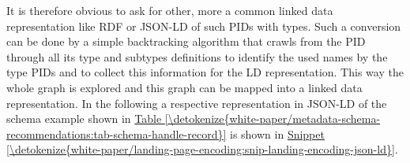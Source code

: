 \documentclass[a4paper,10pt,english]{sphinxmanual}
\begin{document}
It is therefore obvious to ask for other, more a common linked data
representation like RDF or JSON-LD of such PIDs with types. Such a
conversion can be done by a simple backtracking algorithm that crawls
from the PID through all its type and subtypes definitions to identify
the used names by the type PIDs and to collect this information for the
LD representation. This way the whole graph is explored and this graph
can be mapped into a linked data representation. In the following a
respective representation in JSON-LD of the schema example shown in
\hyperref[\detokenize{white-paper/metadata-schema-recommendations:tab-schema-handle-record}]{Table \ref{\detokenize{white-paper/metadata-schema-recommendations:tab-schema-handle-record}}} is shown in
\hyperref[\detokenize{white-paper/landing-page-encoding:snip-landing-encoding-json-ld}]{Snippet \ref{\detokenize{white-paper/landing-page-encoding:snip-landing-encoding-json-ld}}}.
\def\sphinxLiteralBlockLabel{\label{\detokenize{white-paper/landing-page-encoding:id4}}\label{\detokenize{white-paper/landing-page-encoding:snip-landing-encoding-json-ld}}}
\end{document}
